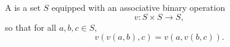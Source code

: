 A  is a set $S$ equipped with an associative binary operation
$$v: S \times S \to S,$$
so that for all $a,b,c \in S$,
$$v(v(a,b),c) = v(a,v(b,c)).$$
